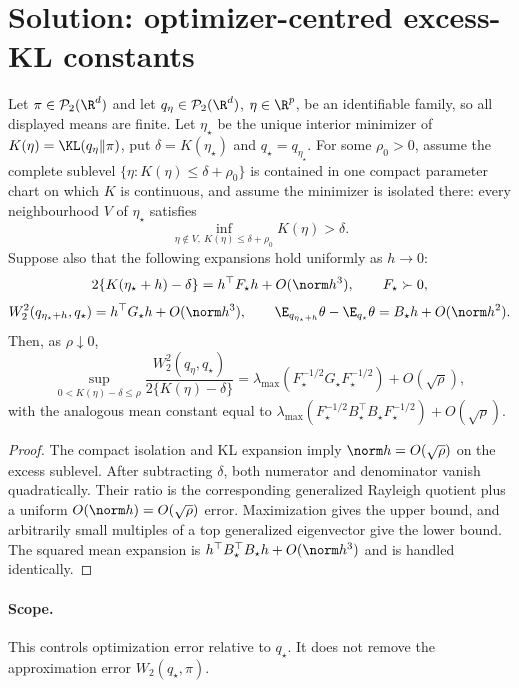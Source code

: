 \documentclass[../main.tex]{subfiles}
\begin{document}

\section*{Solution: optimizer-centred excess-KL constants}

\begin{theorem}
Let $\pi\in\mathcal P_2(\R^d)$ and let $q_\eta\in\mathcal P_2(\R^d)$, $\eta\in\R^p$, be an
identifiable family, so all displayed means are finite. Let $\eta_\star$ be the unique interior
minimizer of $K(\eta)=\KL(q_\eta\|\pi)$, put $\delta=K(\eta_\star)$ and
$q_\star=q_{\eta_\star}$. For some $\rho_0>0$, assume the complete sublevel
$\{\eta:K(\eta)\le\delta+\rho_0\}$ is contained in one compact parameter chart on which $K$
is continuous, and assume the minimizer is isolated there: every neighbourhood $V$ of
$\eta_\star$ satisfies
\[
 \inf_{\eta\notin V,\ K(\eta)\le\delta+\rho_0}K(\eta)>\delta.
\]
Suppose also that the following expansions hold uniformly as $h\to0$:
\[
 2\{K(\eta_\star+h)-\delta\}=h^\top F_\star h+O(\norm h^3),\qquad F_\star\succ0,
\]
\[
 W_2^2(q_{\eta_\star+h},q_\star)=h^\top G_\star h+O(\norm h^3),
 \qquad \E_{q_{\eta_\star+h}}\theta-\E_{q_\star}\theta=B_\star h+O(\norm h^2).
\]
Then, as $\rho\downarrow0$,
\[
 \sup_{0<K(\eta)-\delta\le\rho}
 \frac{W_2^2(q_\eta,q_\star)}{2\{K(\eta)-\delta\}}
 =\lambda_{\max}(F_\star^{-1/2}G_\star F_\star^{-1/2})+O(\sqrt\rho),
\]
with the analogous mean constant equal to
$\lambda_{\max}(F_\star^{-1/2}B_\star^\top B_\star F_\star^{-1/2})+O(\sqrt\rho)$.
\end{theorem}

\begin{proof}
The compact isolation and KL expansion imply $\norm h=O(\sqrt\rho)$ on the excess sublevel.
After subtracting $\delta$, both numerator and denominator vanish quadratically. Their ratio is
the corresponding generalized Rayleigh quotient plus a uniform $O(\norm h)=O(\sqrt\rho)$
error. Maximization gives the upper bound, and arbitrarily small multiples of a top generalized
eigenvector give the lower bound. The squared mean expansion is
$h^\top B_\star^\top B_\star h+O(\norm h^3)$ and is handled identically.
\end{proof}

\paragraph{Scope.}
This controls optimization error relative to $q_\star$. It does not remove the approximation
error $W_2(q_\star,\pi)$.
\end{document}
